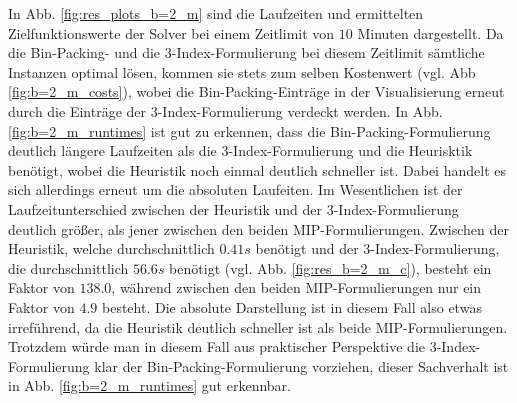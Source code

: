 In Abb. \ref{fig:res_plots_b=2_m} sind die Laufzeiten und ermittelten Zielfunktionswerte der Solver bei einem Zeitlimit von $10$
Minuten dargestellt. Da die Bin-Packing- und die 3-Index-Formulierung bei diesem Zeitlimit sämtliche Instanzen optimal lösen,
kommen sie stets zum selben Kostenwert (vgl. Abb \ref{fig:b=2_m_costs}),
wobei die Bin-Packing-Einträge in der Visualisierung erneut durch die Einträge der 3-Index-Formulierung verdeckt werden.
In Abb. \ref{fig:b=2_m_runtimes} ist gut zu erkennen, dass die Bin-Packing-Formulierung deutlich längere Laufzeiten als die 3-Index-Formulierung und die Heurisktik benötigt, wobei die Heuristik noch einmal deutlich schneller ist. Dabei handelt es sich allerdings erneut um die absoluten Laufeiten. Im Wesentlichen ist der Laufzeitunterschied zwischen der Heuristik und der 3-Index-Formulierung deutlich größer, als jener zwischen den beiden MIP-Formulierungen. Zwischen der Heuristik, welche durchschnittlich $0.41s$ benötigt und der 3-Index-Formulierung, die durchschnittlich $56.6s$ benötigt (vgl. Abb. \ref{fig:res_b=2_m_c}), besteht ein Faktor von $138.0$, während zwischen den beiden MIP-Formulierungen nur ein Faktor von $4.9$ besteht. Die absolute Darstellung ist in diesem Fall also etwas irreführend, da die Heuristik deutlich schneller ist als beide MIP-Formulierungen. Trotzdem würde man in diesem Fall aus praktischer Perspektive die 3-Index-Formulierung klar der Bin-Packing-Formulierung vorziehen, dieser Sachverhalt ist in Abb. \ref{fig:b=2_m_runtimes} gut erkennbar.

